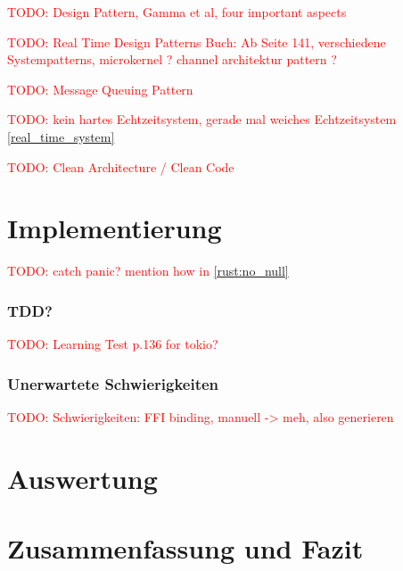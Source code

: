 \documentclass[
	12pt,
	table,
	bigheadings,
	ngerman,
	a4paper,
	BCOR5mm,
	DIV14,
	1.1headlines,
	pagesize,
	oneside,
	openright,
	titlepage,
	headsepline,
	nochapterprefix,
	bibtotoc,
	tocindent,
	listsindent,
	pointlessnumbers,
	cleardoubleempty,
	fleqn,
	halfparskip
]{scrbook}
\newcommand{\todo}[1]{\textcolor{red}{TODO: #1}}
\begin{document}
		\todo{Design Pattern, Gamma et al, four important aspects}
		
		\todo{Real Time Design Patterns Buch: Ab Seite 141, verschiedene Systempatterns, microkernel \cite[151]{douglass2003real}? channel architektur pattern \cite[167]{douglass2003real}?}
		
		\todo{Message Queuing Pattern \cite[207]{douglass2003real}}
		
		\todo{kein hartes Echtzeitsystem, gerade mal weiches Echtzeitsystem \autoref{real_time_system}}
		
		\todo{Clean Architecture / Clean Code}
	
	\chapter{Implementierung}
	
	\todo{catch panic? mention how in \autoref{rust:no_null}}
		\subsection{TDD?}
		\todo{Learning Test p.136 for tokio?}
		\subsection{Unerwartete Schwierigkeiten}
		\label{impl:issue:ffi}
			\todo{Schwierigkeiten: FFI binding, manuell -> meh, also generieren}
			
			
	\chapter{Auswertung}
	
	\chapter{Zusammenfassung und Fazit}
	
	
	
	
	\clearpage
	\normalem
	\printbibliography
	
	\clearpage
	\printglossary[type=\acronymtype]

	\clearpage
	\listoffigures
	\lstlistoflistings
	
	
\end{document}
